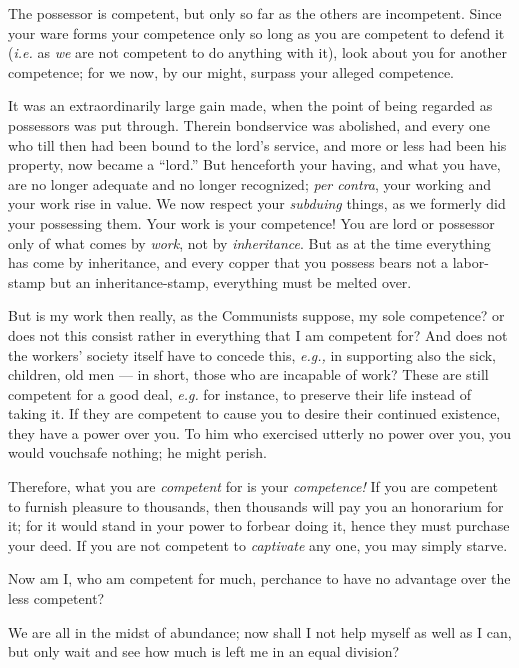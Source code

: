 The possessor is competent, but only so far as the others are incompetent. 
Since your ware forms your competence only so long as you are competent to 
defend it (\textit{i.e.} as \textit{we} are not competent to do anything with 
it), look about you for another competence; for we now, by our might, surpass 
your alleged competence.

It was an extraordinarily large gain made, when the point of being regarded as 
possessors was put through. Therein bondservice was abolished, and every one 
who till then had been bound to the lord's service, and more or less had been 
his property, now became a ``lord.'' But henceforth your having, and what 
you have, are no longer adequate and no longer recognized; \textit{per 
contra}, your working and your work rise in value. We now respect your 
\textit{subduing} things, as we formerly did your possessing them. Your work 
is your competence! You are lord or possessor only of what comes by 
\textit{work}, not by \textit{inheritance}. But as at the time everything has 
come by inheritance, and every copper that you possess bears not a labor-stamp 
but an inheritance-stamp, everything must be melted over.

But is my work then really, as the Communists suppose, my sole competence? or 
does not this consist rather in everything that I am competent for? And does 
not the workers' society itself have to concede this, \textit{e.g.,} in 
supporting also the sick, children, old men --- in short, those who are 
incapable of work? These are still competent for a good deal, \textit{e.g.} 
for instance, to preserve their life instead of taking it. If they are 
competent to cause you to desire their continued existence, they have a power 
over you. To him who exercised utterly no power over you, you would vouchsafe 
nothing; he might perish.

Therefore, what you are \textit{competent} for is your \textit{competence!} If 
you are competent to furnish pleasure to thousands, then thousands will pay 
you an honorarium for it; for it would stand in your power to forbear doing 
it, hence they must purchase your deed. If you are not competent to 
\textit{captivate} any one, you may simply starve.

Now am I, who am competent for much, perchance to have no advantage over the 
less competent?

We are all in the midst of abundance; now shall I not help myself as well as I 
can, but only wait and see how much is left me in an equal division?

